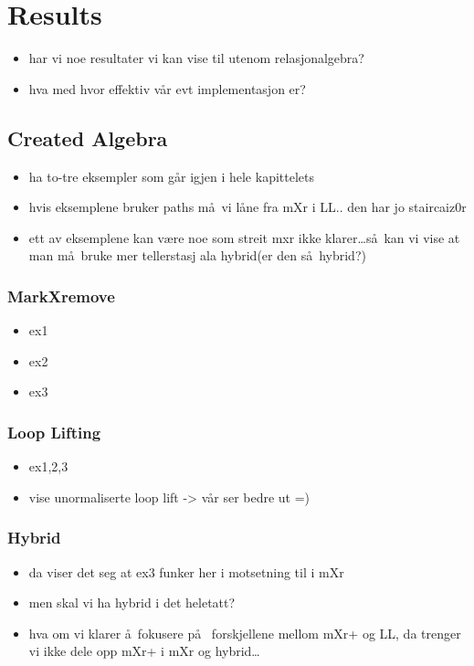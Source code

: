 \chapter{Results}
\label{chapter:results}
\begin{itemize}
  \item har vi noe resultater vi kan vise til utenom relasjonalgebra?
  \item hva med hvor effektiv v\aa r evt implementasjon er?
\end{itemize}

\section{Created Algebra}
\begin{itemize}
  \item ha to-tre eksempler som g\aa r igjen i hele kapittelets
  \item hvis eksemplene bruker paths m\aa~vi l\aa ne fra mXr i LL.. den har jo staircaiz0r
  \item ett av eksemplene kan v\ae re noe som streit mxr ikke klarer\ldots s\aa~kan vi vise at man m\aa~bruke mer
  tellerstasj ala hybrid(er den s\aa~hybrid?)
\end{itemize}

\subsection{MarkXremove}
\label{sect:results:createMxR}
\begin{itemize}
  \item ex1
  \item ex2
  \item ex3
\end{itemize}

\subsection{Loop Lifting}
\label{sect:results:createLL}
\begin{itemize}
  \item ex1,2,3
  \item vise unormaliserte loop lift -> v\aa r ser bedre ut =) 
\end{itemize}

\subsection{Hybrid}
\label{sect:results:createHybrid}
\begin{itemize}
  \item da viser det seg at ex3 funker her i motsetning til i mXr
  \item men skal vi ha hybrid i det heletatt?
  \item hva om vi klarer \aa~fokusere p\aa~ forskjellene mellom mXr+ og LL, da trenger vi ikke dele opp mXr+ i mXr
  og hybrid\ldots
\end{itemize}





